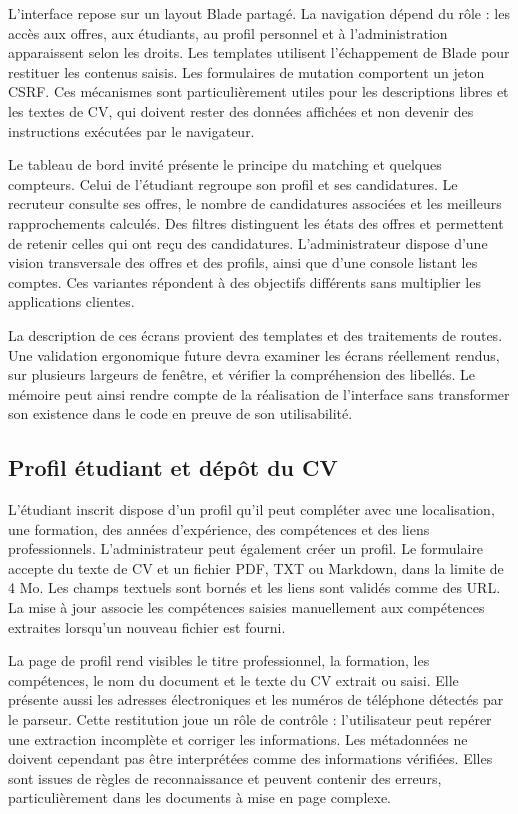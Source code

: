 L'interface repose sur un layout Blade partagé. La navigation dépend du rôle : les accès aux offres, aux étudiants, au profil personnel et à l'administration apparaissent selon les droits. Les templates utilisent l'échappement de Blade pour restituer les contenus saisis. Les formulaires de mutation comportent un jeton CSRF. Ces mécanismes sont particulièrement utiles pour les descriptions libres et les textes de CV, qui doivent rester des données affichées et non devenir des instructions exécutées par le navigateur.

Le tableau de bord invité présente le principe du matching et quelques compteurs. Celui de l'étudiant regroupe son profil et ses candidatures. Le recruteur consulte ses offres, le nombre de candidatures associées et les meilleurs rapprochements calculés. Des filtres distinguent les états des offres et permettent de retenir celles qui ont reçu des candidatures. L'administrateur dispose d'une vision transversale des offres et des profils, ainsi que d'une console listant les comptes. Ces variantes répondent à des objectifs différents sans multiplier les applications clientes.

La description de ces écrans provient des templates et des traitements de routes. Une validation ergonomique future devra examiner les écrans réellement rendus, sur plusieurs largeurs de fenêtre, et vérifier la compréhension des libellés. Le mémoire peut ainsi rendre compte de la réalisation de l'interface sans transformer son existence dans le code en preuve de son utilisabilité.

\subsection{Profil étudiant et dépôt du CV}

L'étudiant inscrit dispose d'un profil qu'il peut compléter avec une localisation, une formation, des années d'expérience, des compétences et des liens professionnels. L'administrateur peut également créer un profil. Le formulaire accepte du texte de CV et un fichier PDF, TXT ou Markdown, dans la limite de 4 Mo. Les champs textuels sont bornés et les liens sont validés comme des URL. La mise à jour associe les compétences saisies manuellement aux compétences extraites lorsqu'un nouveau fichier est fourni.

La page de profil rend visibles le titre professionnel, la formation, les compétences, le nom du document et le texte du CV extrait ou saisi. Elle présente aussi les adresses électroniques et les numéros de téléphone détectés par le parseur. Cette restitution joue un rôle de contrôle : l'utilisateur peut repérer une extraction incomplète et corriger les informations. Les métadonnées ne doivent cependant pas être interprétées comme des informations vérifiées. Elles sont issues de règles de reconnaissance et peuvent contenir des erreurs, particulièrement dans les documents à mise en page complexe.

